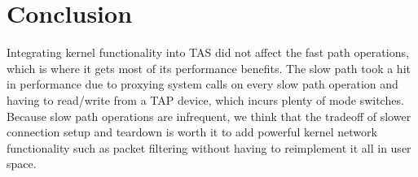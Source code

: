 \section{Conclusion}\label{Conclusion}


Integrating kernel functionality into TAS did not affect the fast path operations, which is where
it gets most of its performance benefits.
The slow path took a hit in performance due to proxying system calls on every slow path
operation and having to read/write from a TAP device, which incurs plenty of mode switches.
Because slow path operations are infrequent, we think that the tradeoff of slower connection setup
and teardown is worth it to add powerful kernel network functionality such as packet filtering without
having to reimplement it all in user space.



